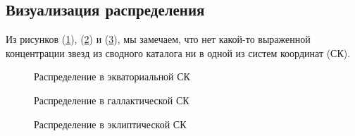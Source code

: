 \documentclass[14pt]{article} %
\begin{document}
\subsection{Визуализация распределения}\label{sub:smthrs}

Из  рисунков (\ref{img:hiptgasra}), (\ref{img:hiptgasl}) и  (\ref{img:hiptgaslo}), мы замечаем, что нет какой-то выраженной концентрации звезд из сводного каталога ни в одной из систем координат (СК).

\begin{figure}[h!]
\caption{Распределение в экваториальной СК}
\label{img:hiptgasra}
\end{figure}
\begin{figure}[h!]
\caption{Распределение в галлактической СК}
\label{img:hiptgasl}
\end{figure}
\begin{figure}[h!]
\caption{Распределение в эклиптической СК}
\label{img:hiptgaslo}
\end{figure}
\end{document}
